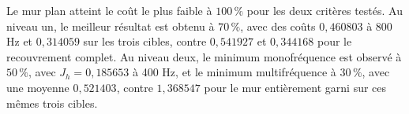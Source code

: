 Le mur plan atteint le coût le plus faible à $100\,\%$ pour les deux critères testés. Au niveau un, le meilleur résultat est obtenu à $70\,\%$, avec des coûts $0,460803$ à 800 Hz et $0,314059$ sur les trois cibles, contre $0,541927$ et $0,344168$ pour le recouvrement complet. Au niveau deux, le minimum monofréquence est observé à $50\,\%$, avec $J_h=0,185653$ à 400 Hz, et le minimum multifréquence à $30\,\%$, avec une moyenne $0,521403$, contre $1,368547$ pour le mur entièrement garni sur ces mêmes trois cibles.

